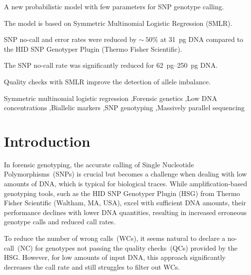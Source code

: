 \documentclass[preprint,5p,times,11pt]{elsarticle}
\begin{document}
\begin{frontmatter}
\onecolumn
\begin{highlights}
\item A new probabilistic model with few parameters for SNP genotype calling.
\item The model is based on Symmetric Multinomial Logistic Regression (SMLR).
\item SNP no-call and error rates were reduced by $\sim\!\!\!\:50\%$ at \SI{31}{\pg} DNA compared to the HID SNP Genotyper Plugin (Thermo Fisher Scientific).
\item The SNP no-call rate was significantly reduced for \SIrange[range-units = single, range-phrase = --]{62}{250}{\pg} DNA.
\item Quality checks with SMLR improve the detection of allele imbalance.
\end{highlights}

\begin{keyword}
Symmetric multinomial logistic regression \sep Forensic genetics \sep Low DNA concentrations \sep Biallelic markers \sep SNP genotyping \sep Massively parallel sequencing


\end{keyword}
\end{frontmatter}


\section{Introduction}
In forensic genotyping, the accurate calling of Single Nucleotide Polymorphisms~(SNPs) is crucial but becomes a challenge when dealing with low amounts of DNA, which is typical for biological traces.
While amplification-based genotyping tools, such as the HID SNP Genotyper Plugin (HSG) from Thermo Fisher Scientific (Waltham, MA, USA), excel with sufficient DNA amounts, their performance declines with lower DNA quantities, resulting in increased erroneous genotype calls and reduced call rates\cite{alasfi, mostad, butler, swgdam}.

To reduce the number of wrong calls~(WCs), it seems natural to declare a no-call~(NC) for genotypes not passing the quality checks~(QCs) provided by the HSG.
However, for low amounts of input DNA, this approach significantly decreases the call rate and still struggles to filter out WCs.
\end{document}
